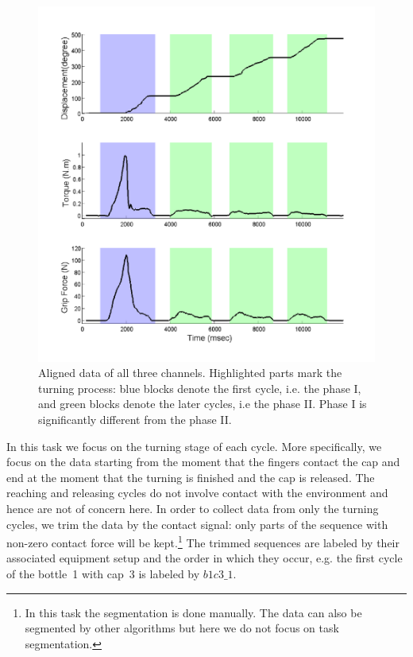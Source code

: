 \begin{figure}[ht!]
  \centering
  \hspace{-1cm}
  \includegraphics[width=14cm]{./fig_cha4/b3c2_1_sTF.pdf}
  \vspace{-0.5cm}
  \caption{  {Aligned data of all three channels. Highlighted parts mark the turning process: blue blocks denote the first cycle, i.e. the phase I, and green blocks denote the later cycles, i.e the phase II. Phase I is significantly different from the phase II.}
}
\label{fig:3channels}
\end{figure}

In this task we focus on the turning stage of each cycle. More specifically, we focus on the data starting from the moment that the fingers contact the cap and end at the moment that the turning is finished and the cap is released. The reaching and releasing cycles do not involve contact with the environment and hence are not of concern here.
In order to collect data from only the turning cycles, we trim the data by the contact signal: only parts of the sequence with non-zero contact force will be kept.\footnote{In this task the segmentation is done manually. The data can also be segmented by other algorithms but here we do not focus on task segmentation.} The trimmed sequences are labeled by their associated equipment setup and the order in which they occur, e.g. the first cycle of the bottle~1 with cap~3 is labeled by $b1c3\_1$.

